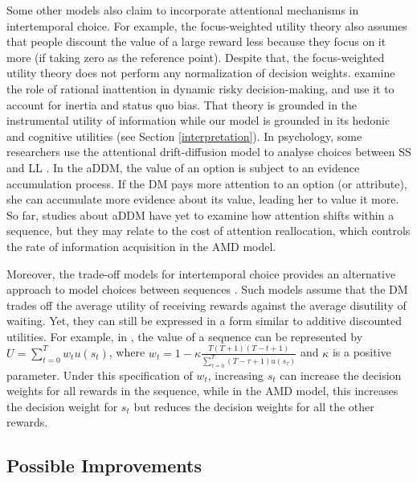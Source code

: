 \documentclass[
  12pt,
]{article}
\begin{document}
Some other models also claim to incorporate attentional mechanisms in
intertemporal choice. For example, the focus-weighted utility theory
\citep{kHoszegi2013model} also assumes that people discount the value of
a large reward less because they focus on it more (if taking zero as the
reference point). Despite that, the focus-weighted utility theory does
not perform any normalization of decision weights.
\citet{steiner2017rational} examine the role of rational inattention in
dynamic risky decision-making, and use it to account for inertia and
status quo bias. That theory is grounded in the instrumental utility of
information while our model is grounded in its hedonic and cognitive
utilities (see Section \ref{interpretation}). In psychology, some
researchers use the attentional drift-diffusion model
\citep[aDDM, see][]{krajbich2010visual} to analyse choices between SS
and LL \citep{amasino2019amount}. In the aDDM, the value of an option is
subject to an evidence accumulation process. If the DM pays more
attention to an option (or attribute), she can accumulate more evidence
about its value, leading her to value it more. So far, studies about
aDDM have yet to examine how attention shifts within a sequence, but
they may relate to the cost of attention reallocation, which controls
the rate of information acquisition in the AMD model.

Moreover, the trade-off models for intertemporal choice provides an
alternative approach to model choices between sequences
\citep[\citet{scholten2016cumulative},
\citet{scholten2024unified}]{read2012tradeoffs}. Such models assume that
the DM trades off the average utility of receiving rewards against the
average disutility of waiting. Yet, they can still be expressed in a
form similar to additive discounted utilities. For example, in
\citet{scholten2016cumulative}, the value of a sequence can be
represented by \(U=\sum_{t=0}^T w_tu(s_t)\), where
\(w_t=1-\kappa\frac{T(T+1)(T-t+1)}{\sum_{\tau=0}^T (T-\tau+1)u(s_\tau)}\)
and \(\kappa\) is a positive parameter. Under this specification of
\(w_t\), increasing \(s_t\) can increase the decision weights for all
rewards in the sequence, while in the AMD model, this increases the
decision weight for \(s_t\) but reduces the decision weights for all the
other rewards.

\hypertarget{possible-improvements}{%
\subsection{Possible Improvements}\label{possible-improvements}}
\end{document}
